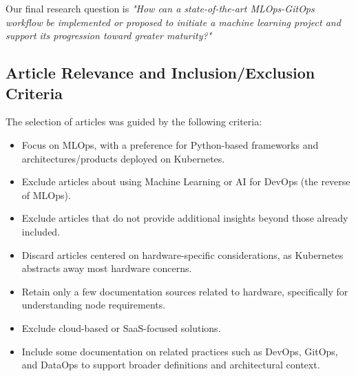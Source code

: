 Our final research question is
\textit{"How can a state-of-the-art MLOps-GitOps workflow be implemented or proposed to initiate a machine learning project and support its progression toward greater maturity?"} %

\subsection{Article Relevance and Inclusion/Exclusion Criteria}\label{subsec:articles-relevance-and-inclusion/exclusion-criteria}

The selection of articles was guided by the following criteria:
\begin{itemize}
    \item Focus on MLOps, with a preference for Python-based frameworks and architectures/products deployed on Kubernetes.
    \item Exclude articles about using Machine Learning or AI for DevOps (the reverse of MLOps).
    \item Exclude articles that do not provide additional insights beyond those already included.
    \item Discard articles centered on hardware-specific considerations, as Kubernetes abstracts away most hardware concerns.
    \item Retain only a few documentation sources related to hardware, specifically for understanding node requirements.
    \item Exclude cloud-based or SaaS-focused solutions.
    \item Include some documentation on related practices such as DevOps, GitOps, and DataOps to support broader definitions and architectural context.
\end{itemize}